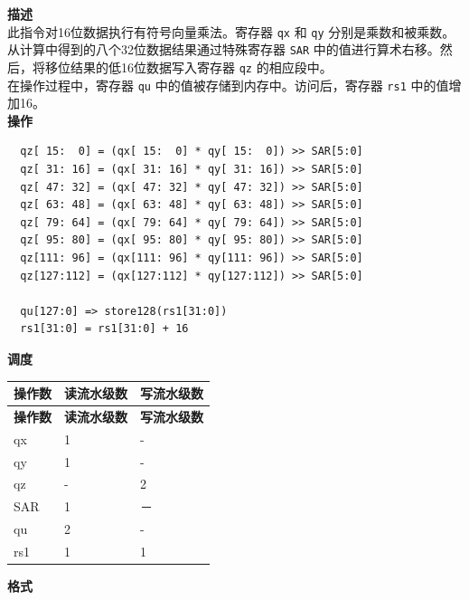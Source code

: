 \textbf{描述}\\
此指令对16位数据执行有符号向量乘法。寄存器 \lstinline{qx} 和 \lstinline{qy} 分别是乘数和被乘数。从计算中得到的八个32位数据结果通过特殊寄存器 \lstinline{SAR} 中的值进行算术右移。然后，将移位结果的低16位数据写入寄存器 \lstinline{qz} 的相应段中。
\\在操作过程中，寄存器 \lstinline{qu} 中的值被存储到内存中。访问后，寄存器 \lstinline{rs1} 中的值增加16。\\
\textbf{操作}
\begin{lstlisting}
  qz[ 15:  0] = (qx[ 15:  0] * qy[ 15:  0]) >> SAR[5:0]
  qz[ 31: 16] = (qx[ 31: 16] * qy[ 31: 16]) >> SAR[5:0]
  qz[ 47: 32] = (qx[ 47: 32] * qy[ 47: 32]) >> SAR[5:0]
  qz[ 63: 48] = (qx[ 63: 48] * qy[ 63: 48]) >> SAR[5:0]
  qz[ 79: 64] = (qx[ 79: 64] * qy[ 79: 64]) >> SAR[5:0]
  qz[ 95: 80] = (qx[ 95: 80] * qy[ 95: 80]) >> SAR[5:0]
  qz[111: 96] = (qx[111: 96] * qy[111: 96]) >> SAR[5:0]
  qz[127:112] = (qx[127:112] * qy[127:112]) >> SAR[5:0]

  qu[127:0] => store128(rs1[31:0])
  rs1[31:0] = rs1[31:0] + 16
\end{lstlisting}


\textbf{调度}\\
\begin{longtable}[c]{|l|l|l|}
    \hline
    \rowcolor{lightgray}
    \textbf{操作数} & \textbf{读流水级数} & \textbf{写流水级数} \\\hline
    \endfirsthead
    \hline
    \rowcolor{lightgray}
     \textbf{操作数} & \textbf{读流水级数} & \textbf{写流水级数} \\\hline
    \endhead
    \hline
    \endfoot

    qx & 1 & - \\\hline
  qy & 1 & - \\\hline
     qz & - & 2 \\\hline
    SAR & 1 & － \\\hline
    qu & 2 & - \\\hline
    rs1 & 1 & 1

\end{longtable}

\textbf{格式}\\

